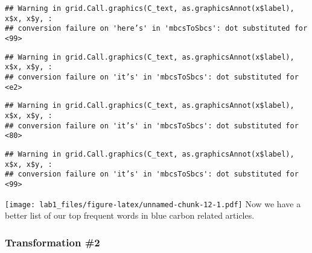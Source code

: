 \documentclass[
]{article}
\begin{document}
\begin{verbatim}
## Warning in grid.Call.graphics(C_text, as.graphicsAnnot(x$label), x$x, x$y, :
## conversion failure on 'here’s' in 'mbcsToSbcs': dot substituted for <99>
\end{verbatim}

\begin{verbatim}
## Warning in grid.Call.graphics(C_text, as.graphicsAnnot(x$label), x$x, x$y, :
## conversion failure on 'it’s' in 'mbcsToSbcs': dot substituted for <e2>
\end{verbatim}

\begin{verbatim}
## Warning in grid.Call.graphics(C_text, as.graphicsAnnot(x$label), x$x, x$y, :
## conversion failure on 'it’s' in 'mbcsToSbcs': dot substituted for <80>
\end{verbatim}

\begin{verbatim}
## Warning in grid.Call.graphics(C_text, as.graphicsAnnot(x$label), x$x, x$y, :
## conversion failure on 'it’s' in 'mbcsToSbcs': dot substituted for <99>
\end{verbatim}

\texttt{[image: lab1\_files/figure-latex/unnamed-chunk-12-1.pdf]} Now we
have a better list of our top frequent words in blue carbon related
articles.

\hypertarget{transformation-2}{%
\subsubsection{Transformation \#2}\label{transformation-2}}
\end{document}
